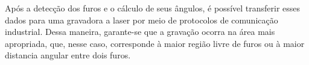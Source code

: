 \documentclass[conference]{IEEEtran}
\begin{document}
Após a detecção dos furos e o cálculo de seus ângulos, é possível transferir esses dados para uma gravadora a laser por meio de protocolos de comunicação industrial. Dessa maneira, garante-se que a gravação ocorra na área mais apropriada, que, nesse caso, corresponde à maior região livre de furos ou à maior distancia angular entre dois furos. 





\end{document}
